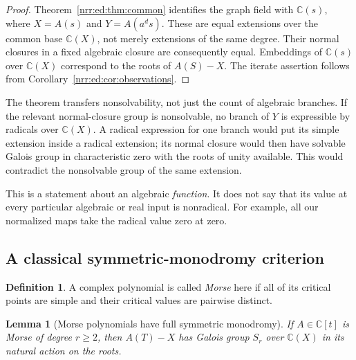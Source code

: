 \documentclass[11pt,letterpaper]{article}
\newtheorem{lemma}[theorem]{Lemma}
\theoremstyle{definition}
\newtheorem{definition}[theorem]{Definition}
\theoremstyle{remark}
\newcommand{\C}{\mathbb C}
\begin{document}
\begin{proof}
Theorem~\ref{nrr:ed:thm:common} identifies the graph field with $\C(s)$, where
$X=A(s)$ and $Y=A(a^ds)$. These are equal extensions over the common base
$\C(X)$, not merely extensions of the same degree. Their normal closures in a
fixed algebraic closure are consequently equal. Embeddings of $\C(s)$ over
$\C(X)$ correspond to the roots of $A(S)-X$. The iterate assertion follows
from Corollary~\ref{nrr:ed:cor:observations}.
\end{proof}

The theorem transfers nonsolvability, not just the count of algebraic branches.
If the relevant normal-closure group is nonsolvable, no branch of $Y$ is
expressible by radicals over $\C(X)$. A radical expression for one branch would
put its simple extension inside a radical extension; its normal closure would
then have solvable Galois group in characteristic zero with the roots of unity
available. This would contradict the nonsolvable group of the same extension.

This is a statement about an algebraic \emph{function}. It does not say that its
value at every particular algebraic or real input is nonradical. For example, all
our normalized maps take the radical value zero at zero.

\subsection{A classical symmetric-monodromy criterion}

\begin{definition}
A complex polynomial is called \emph{Morse} here if all of its critical points
are simple and their critical values are pairwise distinct.
\end{definition}

\begin{lemma}[Morse polynomials have full symmetric monodromy]
\label{nrr:ed:lem:morse}
If $A\in\C[t]$ is Morse of degree $r\ge2$, then $A(T)-X$ has Galois group $S_r$
over $\C(X)$ in its natural action on the roots.
\end{lemma}
\end{document}
